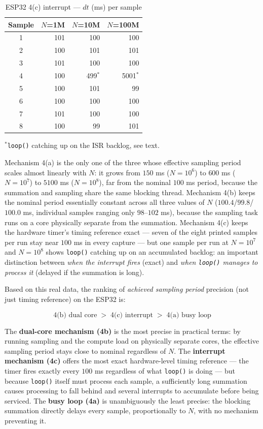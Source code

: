 \begin{table}[!t]
\centering
\caption{ESP32 4(c) interrupt — $dt$ (ms) per sample}
\label{tab:esp32-c}
\small
\begin{tabular}{@{}c r r r@{}}
\toprule
Sample & $N$=1M & $N$=10M & $N$=100M \\
\midrule
1 & 101 & 100 & 100 \\
2 & 100 & 101 & 101 \\
3 & 101 & 100 & 100 \\
4 & 100 & 499$^{*}$ & 5001$^{*}$ \\
5 & 100 & 101 & 99 \\
6 & 100 & 100 & 100 \\
7 & 101 & 100 & 100 \\
8 & 100 & 99 & 101 \\
\bottomrule
\end{tabular}

\vspace{2pt}
{\footnotesize $^{*}$\texttt{loop()} catching up on the ISR backlog, see text.}
\end{table}

Mechanism 4(a) is the only one of the three whose effective sampling period scales almost linearly with $N$: it grows from $150$ ms ($N=10^6$) to $600$ ms ($N=10^7$) to $5100$ ms ($N=10^8$), far from the nominal $100$ ms period, because the summation and sampling share the same blocking thread. Mechanism 4(b) keeps the nominal period essentially constant across all three values of $N$ ($100.4$/$99.8$/$100.0$ ms, individual samples ranging only $98$–$102$ ms), because the sampling task runs on a core physically separate from the summation. Mechanism 4(c) keeps the hardware timer's timing reference exact — seven of the eight printed samples per run stay near $100$ ms in every capture — but one sample per run at $N=10^7$ and $N=10^8$ shows \texttt{loop()} catching up on an accumulated backlog: an important distinction between \emph{when the interrupt fires} (exact) and \emph{when \texttt{loop()} manages to process it} (delayed if the summation is long).

Based on this real data, the ranking of \emph{achieved sampling period} precision (not just timing reference) on the ESP32 is:

\begin{equation}
\text{4(b) dual core} \;>\; \text{4(c) interrupt} \;>\; \text{4(a) busy loop}
\end{equation}

The \textbf{dual-core mechanism (4b)} is the most precise in practical terms: by running sampling and the compute load on physically separate cores, the effective sampling period stays close to nominal regardless of $N$. The \textbf{interrupt mechanism (4c)} offers the most exact hardware-level timing reference — the timer fires exactly every $100$ ms regardless of what \texttt{loop()} is doing — but because \texttt{loop()} itself must process each sample, a sufficiently long summation causes processing to fall behind and several interrupts to accumulate before being serviced. The \textbf{busy loop (4a)} is unambiguously the least precise: the blocking summation directly delays every sample, proportionally to $N$, with no mechanism preventing it.


